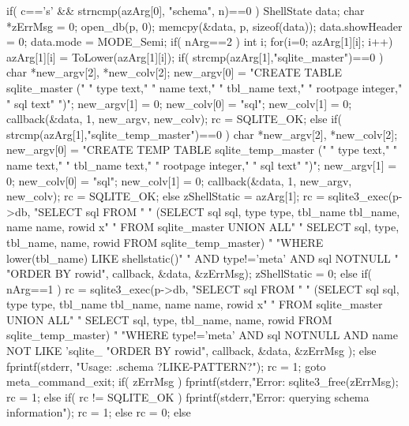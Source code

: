 \begin{Codex}[label=shell.c,numbers=left]
{  if( c=='s' && strncmp(azArg[0], "schema", n)==0 ){
    ShellState data;
    char *zErrMsg = 0;
    open_db(p, 0);
    memcpy(&data, p, sizeof(data));
    data.showHeader = 0;
    data.mode = MODE_Semi;
    if( nArg==2 ){
      int i;
      for(i=0; azArg[1][i]; i++) azArg[1][i] = ToLower(azArg[1][i]);
      if( strcmp(azArg[1],"sqlite_master")==0 ){
        char *new_argv[2], *new_colv[2];
        new_argv[0] = "CREATE TABLE sqlite_master (\n"
                      "  type text,\n"
                      "  name text,\n"
                      "  tbl_name text,\n"
                      "  rootpage integer,\n"
                      "  sql text\n"
                      ")";
        new_argv[1] = 0;
        new_colv[0] = "sql";
        new_colv[1] = 0;
        callback(&data, 1, new_argv, new_colv);
        rc = SQLITE_OK;
      }else if( strcmp(azArg[1],"sqlite_temp_master")==0 ){
        char *new_argv[2], *new_colv[2];
        new_argv[0] = "CREATE TEMP TABLE sqlite_temp_master (\n"
                      "  type text,\n"
                      "  name text,\n"
                      "  tbl_name text,\n"
                      "  rootpage integer,\n"
                      "  sql text\n"
                      ")";
        new_argv[1] = 0;
        new_colv[0] = "sql";
        new_colv[1] = 0;
        callback(&data, 1, new_argv, new_colv);
        rc = SQLITE_OK;
      }else{
        zShellStatic = azArg[1];
        rc = sqlite3_exec(p->db,
          "SELECT sql FROM "
          "  (SELECT sql sql, type type, tbl_name tbl_name, name name, rowid x"
          "     FROM sqlite_master UNION ALL"
          "   SELECT sql, type, tbl_name, name, rowid FROM sqlite_temp_master) "
          "WHERE lower(tbl_name) LIKE shellstatic()"
          "  AND type!='meta' AND sql NOTNULL "
          "ORDER BY rowid",
          callback, &data, &zErrMsg);
        zShellStatic = 0;
      }
    }else if( nArg==1 ){
      rc = sqlite3_exec(p->db,
         "SELECT sql FROM "
         "  (SELECT sql sql, type type, tbl_name tbl_name, name name, rowid x"
         "     FROM sqlite_master UNION ALL"
         "   SELECT sql, type, tbl_name, name, rowid FROM sqlite_temp_master) "
         "WHERE type!='meta' AND sql NOTNULL AND name NOT LIKE 'sqlite_%
         "ORDER BY rowid",
         callback, &data, &zErrMsg
      );
    }else{
      fprintf(stderr, "Usage: .schema ?LIKE-PATTERN?\n");
      rc = 1;
      goto meta_command_exit;
    }
    if( zErrMsg ){
      fprintf(stderr,"Error: %
      sqlite3_free(zErrMsg);
      rc = 1;
    }else if( rc != SQLITE_OK ){
      fprintf(stderr,"Error: querying schema information\n");
      rc = 1;
    }else{
      rc = 0;
    }
  }else


}
\end{Codex}
